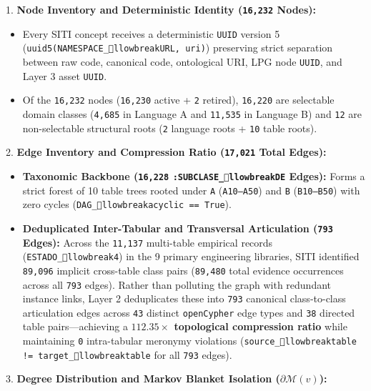 \documentclass[10pt,a4paper]{article}
\begin{document}
1. \textbf{Node Inventory and Deterministic Identity (\texttt{16,232} Nodes):}\par
\begin{itemize}
  \item Every SITI concept receives a deterministic \texttt{UUID} version 5 (\texttt{uuid5(NAMESPACE\_llowbreak{}URL, uri)}) preserving strict separation between raw code, canonical code, ontological URI, LPG node \texttt{UUID}, and Layer 3 asset \texttt{UUID}.
  \item Of the \texttt{16,232} nodes (\texttt{16,230} active + \texttt{2} retired), \texttt{16,220} are selectable domain classes (\texttt{4,685} in Language A and \texttt{11,535} in Language B) and \texttt{12} are non-selectable structural roots (\texttt{2} language roots + \texttt{10} table roots).
\end{itemize}
2. \textbf{Edge Inventory and Compression Ratio (\texttt{17,021} Total Edges):}\par
\begin{itemize}
  \item \textbf{Taxonomic Backbone (\texttt{16,228} \texttt{:SUBCLASE\_llowbreak{}DE} Edges):} Forms a strict forest of 10 table trees rooted under \texttt{A} (\texttt{A10--A50}) and \texttt{B} (\texttt{B10--B50}) with zero cycles (\texttt{DAG\_llowbreak{}acyclic == True}).
  \item \textbf{Deduplicated Inter-Tabular and Transversal Articulation (\texttt{793} Edges):} Across the \texttt{11,137} multi-table empirical records (\texttt{ESTADO\_llowbreak{}4}) in the 9 primary engineering libraries, SITI identified \texttt{89,096} implicit cross-table class pairs (\texttt{89,480} total evidence occurrences across all \texttt{793} edges). Rather than polluting the graph with redundant instance links, Layer 2 deduplicates these into \texttt{793} canonical class-to-class articulation edges across \texttt{43} distinct \texttt{openCypher} edge types and \texttt{38} directed table pairs---achieving a \textbf{$112.35\times$ topological compression ratio} while maintaining \texttt{0} intra-tabular meronymy violations (\texttt{source\_llowbreak{}table != target\_llowbreak{}table} for all \texttt{793} edges).
\end{itemize}
3. \textbf{Degree Distribution and Markov Blanket Isolation ($\partial\mathcal{M}(v)$):}\par
\end{document}
